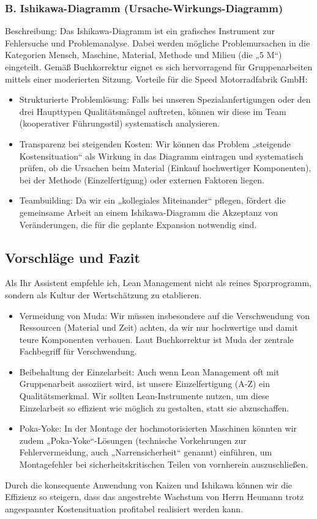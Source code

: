 \documentclass[12pt, a4paper]{article}
\begin{document}
\subsubsection{B. Ishikawa-Diagramm (Ursache-Wirkungs-Diagramm)}
Beschreibung: Das Ishikawa-Diagramm ist ein grafisches Instrument zur Fehlersuche und Problemanalyse. Dabei werden mögliche Problemursachen in die Kategorien Mensch, Maschine, Material, Methode und Milieu (die „5 M“) eingeteilt. Gemäß Buchkorrektur eignet es sich hervorragend für Gruppenarbeiten mittels einer moderierten Sitzung.
Vorteile für die Speed Motorradfabrik GmbH:
\begin{itemize}
    \item Strukturierte Problemlösung: Falls bei unseren Spezialanfertigungen oder den drei Haupttypen Qualitätsmängel auftreten, können wir diese im Team (kooperativer Führungsstil) systematisch analysieren.
    \item Transparenz bei steigenden Kosten: Wir können das Problem „steigende Kostensituation“ als Wirkung in das Diagramm eintragen und systematisch prüfen, ob die Ursachen beim Material (Einkauf hochwertiger Komponenten), bei der Methode (Einzelfertigung) oder externen Faktoren liegen.
    \item Teambuilding: Da wir ein „kollegiales Miteinander“ pflegen, fördert die gemeinsame Arbeit an einem Ishikawa-Diagramm die Akzeptanz von Veränderungen, die für die geplante Expansion notwendig sind.
\end{itemize}
\subsection{Vorschläge und Fazit}
Als Ihr Assistent empfehle ich, Lean Management nicht als reines Sparprogramm, sondern als Kultur der Wertschätzung zu etablieren.
\begin{itemize}
    \item Vermeidung von Muda: Wir müssen insbesondere auf die Verschwendung von Ressourcen (Material und Zeit) achten, da wir nur hochwertige und damit teure Komponenten verbauen. Laut Buchkorrektur ist Muda der zentrale Fachbegriff für Verschwendung.
    \item Beibehaltung der Einzelarbeit: Auch wenn Lean Management oft mit Gruppenarbeit assoziiert wird, ist unsere Einzelfertigung (A-Z) ein Qualitätsmerkmal. Wir sollten Lean-Instrumente nutzen, um diese Einzelarbeit so effizient wie möglich zu gestalten, statt sie abzuschaffen.
    \item Poka-Yoke: In der Montage der hochmotorisierten Maschinen könnten wir zudem „Poka-Yoke“-Lösungen (technische Vorkehrungen zur Fehlervermeidung, auch „Narrensicherheit“ genannt) einführen, um Montagefehler bei sicherheitskritischen Teilen von vornherein auszuschließen.
\end{itemize}
Durch die konsequente Anwendung von Kaizen und Ishikawa können wir die Effizienz so steigern, dass das angestrebte Wachstum von 
Herrn Heumann trotz angespannter Kostensituation profitabel realisiert werden kann.
\newpage
\end{document}
